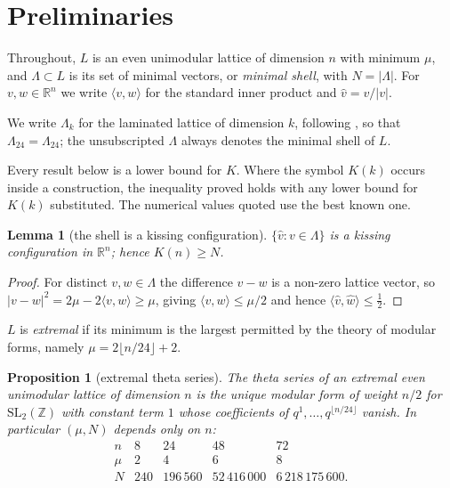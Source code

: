 \documentclass[11pt]{amsart}
\newtheorem{lemma}[theorem]{Lemma}
\newtheorem{proposition}[theorem]{Proposition}
\theoremstyle{remark}
\newcommand{\Leech}{\Lambda_{24}}
\newcommand{\ip}[2]{\langle #1,#2\rangle}
\newcommand{\R}{\mathbb{R}}
\newcommand{\Z}{\mathbb{Z}}
\begin{document}
\section{Preliminaries}\label{sec:prelim}

Throughout, $L$ is an even unimodular lattice of dimension $n$ with minimum
$\mu$, and $\Lambda\subset L$ is its set of minimal vectors, or \emph{minimal
shell}, with $N=|\Lambda|$. For $v,w\in\R^n$ we write $\ip{v}{w}$ for the
standard inner product and $\hat v=v/|v|$.

We write $\Lambda_k$ for the laminated lattice of dimension $k$, following
\cite[Ch.~6]{conway-sloane1999}, so that $\Leech=\Lambda_{24}$; the unsubscripted
$\Lambda$ always denotes the minimal shell of $L$.

Every result below is a lower bound for $K$. Where the symbol $K(k)$ occurs
inside a construction, the inequality proved holds with any lower bound for
$K(k)$ substituted. The numerical values quoted use the best known one.

\begin{lemma}[the shell is a kissing configuration]\label{lem:shell}
$\{\hat v: v\in\Lambda\}$ is a kissing configuration in $\R^n$; hence
$K(n)\ge N$.
\end{lemma}

\begin{proof}
For distinct $v,w\in\Lambda$ the difference $v-w$ is a non-zero lattice vector,
so $|v-w|^2=2\mu-2\ip{v}{w}\ge\mu$, giving $\ip{v}{w}\le\mu/2$ and hence
$\ip{\hat v}{\hat w}\le\tfrac12$.
\end{proof}

$L$ is \emph{extremal} if its minimum is the largest permitted by the theory of
modular forms, namely $\mu=2\lfloor n/24\rfloor+2$.

\begin{proposition}[extremal theta series]\label{prop:theta}
The theta series of an extremal even unimodular lattice of dimension $n$ is the
unique modular form of weight $n/2$ for $\mathrm{SL}_2(\Z)$ with constant term
$1$ whose coefficients of $q^1,\dots,q^{\lfloor n/24\rfloor}$ vanish. In
particular $(\mu,N)$ depends only on $n$:
\[
\begin{array}{lcccc}
 n   & 8   & 24      & 48           & 72 \\
 \mu & 2   & 4       & 6            & 8 \\
 N   & 240 & 196\,560 & 52\,416\,000 & 6\,218\,175\,600.
\end{array}
\]
\end{proposition}
\end{document}
